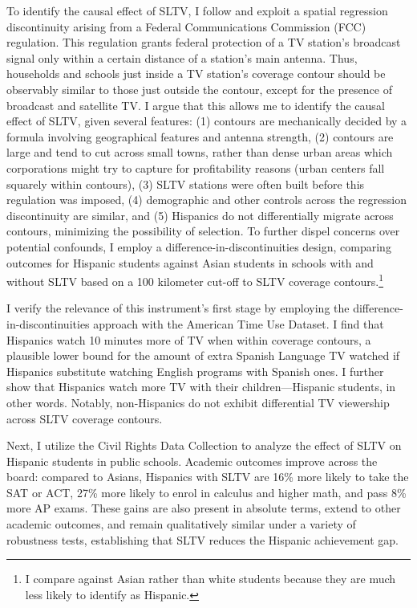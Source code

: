 \documentclass[11pt]{article}
\begin{document}
To identify the causal effect of SLTV, I follow \cite{velez_tuning_2019} and exploit a spatial regression discontinuity arising from a Federal Communications Commission (FCC) regulation. This regulation grants federal protection of a TV station’s broadcast signal only within a certain distance of a station’s main antenna. Thus, households and schools just inside a TV station's coverage contour should be observably similar to those just outside the contour, except for the presence of broadcast and satellite TV. I argue that this allows me to identify the causal effect of SLTV, given several features: (1) contours are mechanically decided by a formula involving geographical features and antenna strength, (2) contours are large and tend to cut across small towns, rather than dense urban areas which corporations might try to capture for profitability reasons (urban centers fall squarely within contours), (3) SLTV stations were often built before this regulation was imposed, (4) demographic and other controls across the regression discontinuity are similar, and (5) Hispanics do not differentially migrate across contours, minimizing the possibility of selection. To further dispel concerns over potential confounds, I employ a difference-in-discontinuities design, comparing outcomes for Hispanic students against Asian students in schools with and without SLTV based on a 100 kilometer cut-off to SLTV coverage contours.\footnote{I compare against Asian rather than white students because they are much less likely to identify as Hispanic.} 

I verify the relevance of this instrument's first stage by employing the difference-in-discontinuities approach with the American Time Use Dataset. I find that Hispanics watch 10 minutes more of TV when within coverage contours, a plausible lower bound for the amount of extra Spanish Language TV watched if Hispanics substitute watching English programs with Spanish ones. I further show that Hispanics watch more TV with their children---Hispanic students, in other words. Notably, non-Hispanics do not exhibit differential TV viewership across SLTV coverage contours.
	
Next, I utilize the Civil Rights Data Collection to analyze the effect of SLTV on Hispanic students in public schools. Academic outcomes improve across the board: compared to Asians, Hispanics with SLTV are 16\% more likely to take the SAT or ACT, 27\% more likely to enrol in calculus and higher math, and pass 8\% more AP exams. These gains are also present in absolute terms, extend to other academic outcomes, and remain qualitatively similar under a variety of robustness tests, establishing that SLTV reduces the Hispanic achievement gap.
\end{document}

